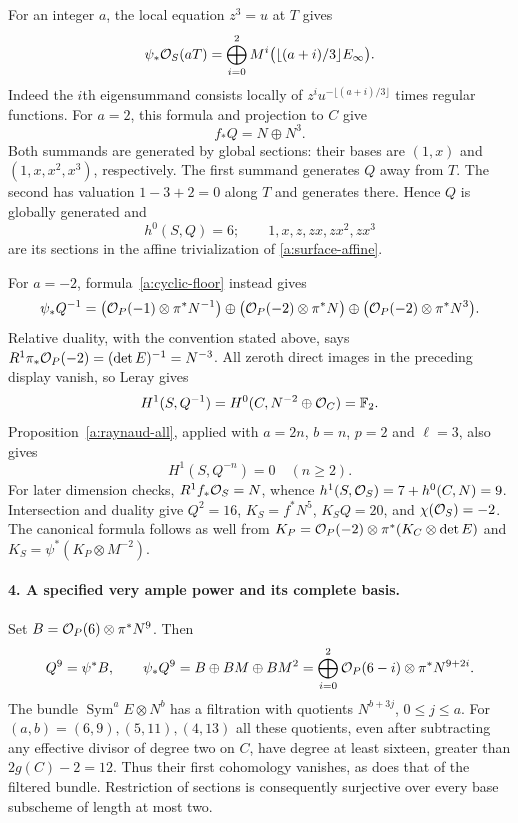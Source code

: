 For an integer $a$, the local equation $z^3=u$ at $T$ gives
\begin{equation}\label{a:cyclic-floor}
 \psi_*\mathcal O_S(aT)=
 \bigoplus_{i=0}^2 M^i\bigl(\lfloor(a+i)/3\rfloor E_\infty\bigr).
\end{equation}
Indeed the $i$th eigensummand consists locally of
$z^i u^{-\lfloor(a+i)/3\rfloor}$ times regular functions.
For $a=2$, this formula and projection to $C$ give
\[
 f_*Q=N\oplus N^3.
\]
Both summands are generated by global sections: their bases are
$(1,x)$ and $(1,x,x^2,x^3)$, respectively. The first summand generates
$Q$ away from $T$. The second has valuation $1-3+2=0$ along $T$
and generates there. Hence $Q$ is globally generated and
\[
 h^0(S,Q)=6;\qquad
 1,x,z,zx,zx^2,zx^3
\]
are its sections in the affine trivialization of
\eqref{a:surface-affine}.

For $a=-2$, formula~\eqref{a:cyclic-floor} instead gives
\[
 \psi_*Q^{-1}=
 \bigl(\mathcal O_P(-1)\otimes\pi^*N^{-1}\bigr)
 \oplus\bigl(\mathcal O_P(-2)\otimes\pi^*N\bigr)
 \oplus\bigl(\mathcal O_P(-2)\otimes\pi^*N^3\bigr).
\]
Relative duality, with the convention stated above, says
$R^1\pi_*\mathcal O_P(-2)=(\det E)^{-1}=N^{-3}$.
All zeroth direct images in the preceding display vanish, so Leray
gives
\begin{equation}\label{a:Q-cohomology}
 H^1(S,Q^{-1})=H^0(C,N^{-2}\oplus\mathcal O_C)=\mathbb F_2.
\end{equation}
Proposition~\ref{a:raynaud-all}, applied with $a=2n$, $b=n$,
$p=2$ and $\ell=3$, also gives
\[
 H^1(S,Q^{-n})=0\quad(n\geq2).
\]
For later dimension checks, $R^1f_*\mathcal O_S=N$, whence
$h^1(S,\mathcal O_S)=7+h^0(C,N)=9$. Intersection and duality give
$Q^2=16$, $K_S=f^*N^5$, $K_SQ=20$, and $\chi(\mathcal O_S)=-2$.
The canonical formula follows as well from
$K_P=\mathcal O_P(-2)\otimes\pi^*(K_C\otimes\det E)$ and
$K_S=\psi^*(K_P\otimes M^{-2})$.

\paragraph{4. A specified very ample power and its complete basis.}
Set $B=\mathcal O_P(6)\otimes\pi^*N^9$. Then
\[
 Q^9=\psi^*B,\qquad
 \psi_*Q^9=B\oplus BM\oplus BM^2
   =\bigoplus_{i=0}^2\mathcal O_P(6-i)\otimes\pi^*N^{9+2i}.
\]
The bundle $\operatorname{Sym}^a E\otimes N^b$ has a filtration
with quotients $N^{b+3j}$, $0\leq j\leq a$.
For $(a,b)=(6,9),(5,11),(4,13)$ all these quotients, even after
subtracting any effective divisor of degree two on $C$, have degree
at least sixteen, greater than $2g(C)-2=12$.
Thus their first cohomology vanishes, as does that of the filtered
bundle. Restriction of sections is consequently surjective over every
base subscheme of length at most two.

